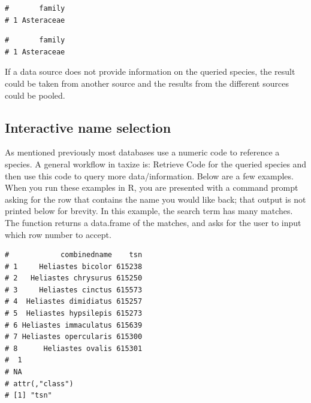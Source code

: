 \begin{sloppypar}
\begin{knitrout}
\small

\color{fgcolor}
\begin{kframe}
\begin{alltt}
\hlstd{(} \hlstd{=} \hlstd{,}  \hlstd{=} \hlstd{,}
          \hlstd{=} \hlstd{)}
\end{alltt}
\begin{verbatim}
#       family
# 1 Asteraceae
\end{verbatim}
\begin{alltt}
\hlstd{(} \hlstd{=} \hlstd{,}  \hlstd{=} \hlstd{,}
          \hlstd{=} \hlstd{)}
\end{alltt}
\begin{verbatim}
#       family
# 1 Asteraceae
\end{verbatim}
\end{kframe}
\end{knitrout}

If a data source does not provide information on the queried species, the result could be taken from another source and the results from the different sources could be pooled.


\subsection{Interactive name selection}
As mentioned previously most databases use a numeric code to reference a species. 
A general workflow in taxize is: Retrieve Code for the queried species and then use this code to query more data/information. 
Below are a few examples. 
When you run these examples in R, you are presented with a command prompt asking for the row that contains the name you would like back; that output is not printed below for brevity. 
In this example, the search term has many matches. 
The function returns a data.frame of the matches, and asks for the user to input which row number to accept. 

\begin{knitrout}
\small

\color{fgcolor}
\begin{kframe}
\begin{alltt}
\hlstd{(} \hlstd{=} \hlstd{,}  \hlstd{=} \hlstd{)}
\end{alltt}
\begin{verbatim}
#            combinedname    tsn
# 1     Heliastes bicolor 615238
# 2   Heliastes chrysurus 615250
# 3     Heliastes cinctus 615573
# 4  Heliastes dimidiatus 615257
# 5  Heliastes hypsilepis 615273
# 6 Heliastes immaculatus 615639
# 7 Heliastes opercularis 615300
# 8      Heliastes ovalis 615301
#  1 
# NA 
# attr(,"class")
# [1] "tsn"
\end{verbatim}
\end{kframe}
\end{knitrout}


\end{sloppypar}
